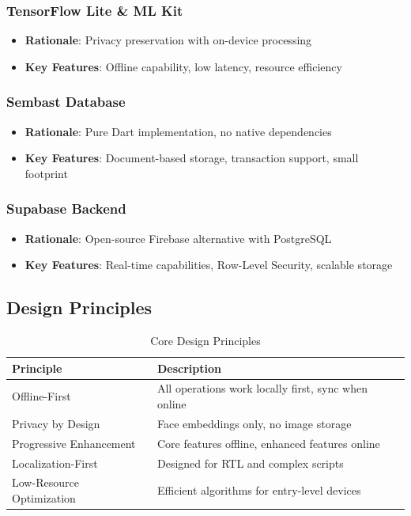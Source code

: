 \documentclass[12pt,a4paper]{article}
\begin{document}
\subsubsection{TensorFlow Lite \& ML Kit}
\begin{itemize}[leftmargin=*, itemsep=0.2em]
    \item \textbf{Rationale}: Privacy preservation with on-device processing
    \item \textbf{Key Features}: Offline capability, low latency, resource efficiency
\end{itemize}

\subsubsection{Sembast Database}
\begin{itemize}[leftmargin=*, itemsep=0.2em]
    \item \textbf{Rationale}: Pure Dart implementation, no native dependencies
    \item \textbf{Key Features}: Document-based storage, transaction support, small footprint
\end{itemize}

\subsubsection{Supabase Backend}
\begin{itemize}[leftmargin=*, itemsep=0.2em]
    \item \textbf{Rationale}: Open-source Firebase alternative with PostgreSQL
    \item \textbf{Key Features}: Real-time capabilities, Row-Level Security, scalable storage
\end{itemize}

\subsection{Design Principles}

\begin{table}[H]
\centering
\small
\begin{tabularx}{\textwidth}{|l|X|}
\hline
\rowcolor{lightgray}
\textbf{Principle} & \textbf{Description} \\
\hline
Offline-First & All operations work locally first, sync when online \\
\hline
Privacy by Design & Face embeddings only, no image storage \\
\hline
Progressive Enhancement & Core features offline, enhanced features online \\
\hline
Localization-First & Designed for RTL and complex scripts \\
\hline
Low-Resource Optimization & Efficient algorithms for entry-level devices \\
\hline
\end{tabularx}
\caption{Core Design Principles}
\end{table}
\end{document}
